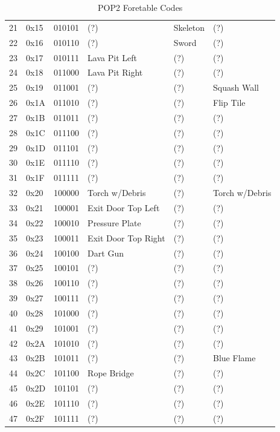 \documentclass{article}
\begin{document}
\begin{table}
\begin{tabular}{llllll}
 21 & 0x15 & 010101 & (?)                & Skeleton          & (?) \\
 22 & 0x16 & 010110 & (?)                & Sword             & (?) \\
 23 & 0x17 & 010111 & Lava Pit Left      & (?)               & (?) \\
 24 & 0x18 & 011000 & Lava Pit Right     & (?)               & (?) \\
 25 & 0x19 & 011001 & (?)                & (?)               & Squash Wall \\
 26 & 0x1A & 011010 & (?)                & (?)               & Flip Tile \\
 27 & 0x1B & 011011 & (?)                & (?)               & (?) \\
 28 & 0x1C & 011100 & (?)                & (?)               & (?) \\
 29 & 0x1D & 011101 & (?)                & (?)               & (?) \\
 30 & 0x1E & 011110 & (?)                & (?)               & (?) \\
 31 & 0x1F & 011111 & (?)                & (?)               & (?) \\
 32 & 0x20 & 100000 & Torch w/Debris     & (?)               & Torch w/Debris \\
 33 & 0x21 & 100001 & Exit Door Top Left & (?)               & (?) \\
 34 & 0x22 & 100010 & Pressure Plate     & (?)               & (?) \\
 35 & 0x23 & 100011 & Exit Door Top Right& (?)               & (?) \\
 36 & 0x24 & 100100 & Dart Gun           & (?)               & (?) \\
 37 & 0x25 & 100101 & (?)                & (?)               & (?) \\
 38 & 0x26 & 100110 & (?)                & (?)               & (?) \\
 39 & 0x27 & 100111 & (?)                & (?)               & (?) \\
 40 & 0x28 & 101000 & (?)                & (?)               & (?) \\
 41 & 0x29 & 101001 & (?)                & (?)               & (?) \\
 42 & 0x2A & 101010 & (?)                & (?)               & (?) \\
 43 & 0x2B & 101011 & (?)                & (?)               & Blue Flame \\
 44 & 0x2C & 101100 & Rope Bridge        & (?)               & (?) \\
 45 & 0x2D & 101101 & (?)                & (?)               & (?) \\
 46 & 0x2E & 101110 & (?)                & (?)               & (?) \\
 47 & 0x2F & 101111 & (?)                & (?)               & (?) \\
\hline
\end{tabular}
\caption{POP2 Foretable Codes}
\label{dat2 foretable}
\end{table}
\end{document}
